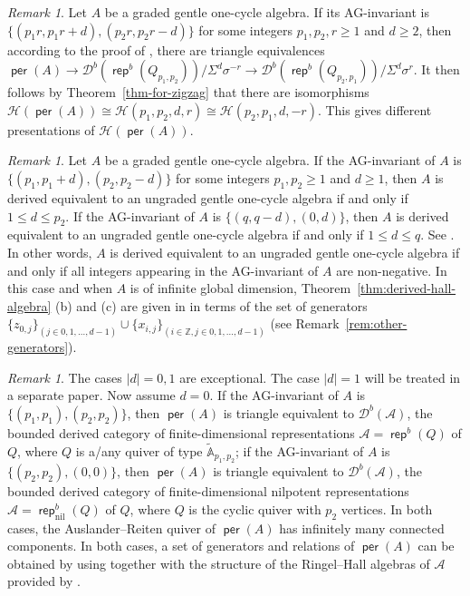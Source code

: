 \documentclass[reqno,12pt,a4paper]{amsart}
\theoremstyle{remark}
\newtheorem{remark}[theorem]{Remark}
\theoremstyle{definition}
\newcommand{\opname}[1]{\operatorname{\mathsf{#1}}}
\newcommand{\rep}{\opname{rep}\nolimits}
\newcommand{\per}{\opname{per}\nolimits}
\newcommand{\ca}{{\mathcal A}}
\newcommand{\cd}{{\mathcal D}}
\newcommand{\ch}{{\mathcal H}}
\numberwithin{equation}{section}
\begin{document}
\begin{remark}
Let $A$ be a graded gentle one-cycle algebra. If its AG-invariant is $\{(p_1r,p_1r+d),(p_2r,p_2r-d)\}$ for some integers $p_1,p_2,r\geq 1$ and $d\geq 2$, then according to the proof of \cite[Theorem 6.7]{ChenYang25}, there are triangle equivalences $\per(A)\to\cd^b(\rep^b(Q_{p_1,p_2}))/\Sigma^d\sigma^{-r}\to\cd^b(\rep^b(Q_{p_2,p_1}))/\Sigma^d\sigma^{r}$. It then follows by Theorem~\ref{thm-for-zigzag} that there are isomorphisms $\ch(\per(A))\cong\ch(p_1,p_2,d,r)\cong\ch(p_2,p_1,d,-r)$. This gives different presentations of $\ch(\per(A))$.
\end{remark}

\begin{remark}
Let $A$ be a graded gentle one-cycle algebra. If the AG-invariant of $A$ is $\{(p_1,p_1+d),(p_2,p_2-d)\}$ for some integers $p_1,p_2\geq 1$ and $d\geq 1$, then $A$ is derived equivalent to an ungraded gentle one-cycle algebra if and only if $1\leq d\leq p_2$. If the AG-invariant of $A$ is $\{(q,q-d),(0,d)\}$, then $A$ is derived equivalent to an ungraded gentle one-cycle algebra if and only if $1\leq d\leq q$. See \cite[Remark 6.3 (c)]{ChenYang25}. In other words, $A$ is derived equivalent to an ungraded gentle one-cycle algebra if and only if all integers appearing in the AG-invariant of $A$ are non-negative. In this case and when $A$ is of infinite global dimension, Theorem~\ref{thm:derived-hall-algebra} (b) and (c) are given in \cite{BobinskiSchmude20} in terms of the set of generators $\{z_{0,j}\}_{(j\in 0,1,\ldots, d-1)}\cup \{x_{i,j}\}_{(i\in \mathbb{Z},j\in 0,1,\ldots, d-1)}$ (see Remark~\ref{rem:other-generators}).
\end{remark}

\begin{remark}
\label{rem:d=0}
The cases $|d|=0,1$ are exceptional. The case $|d|=1$ will be treated in a separate paper. 
Now assume $d=0$. If the AG-invariant of $A$ is $\{(p_1,p_1),(p_2,p_2)\}$, then $\per(A)$ is triangle equivalent to $\cd^b(\ca)$, the bounded derived category of finite-dimensional representations $\ca=\rep^b(Q)$ of $Q$, where $Q$ is a/any quiver of type $\tilde{\mathbb{A}}_{p_1,p_2}$; if the AG-invariant of $A$ is $\{(p_2,p_2),(0,0)\}$, then $\per(A)$ is triangle equivalent to $\cd^b(\ca)$, the bounded derived category of finite-dimensional nilpotent representations $\ca=\rep_{\mathrm{nil}}^b(Q)$ of $Q$, where $Q$ is the cyclic quiver with $p_2$ vertices. In both cases, the Auslander--Reiten quiver of $\per(A)$ has infinitely many connected components. In both cases, a set of generators and relations of $\per(A)$ can be obtained by using \cite[Section 7]{Toen06} together with the structure of the Ringel--Hall algebras of $\ca$ provided by \cite[Theorem 1.1]{SevenhantvandenBergh01}.
\end{remark}
\end{document}
